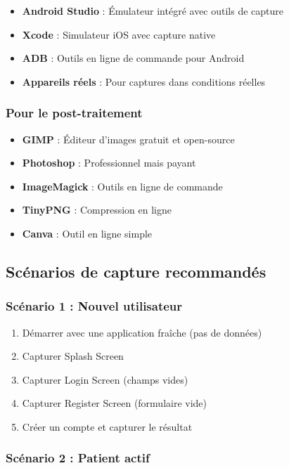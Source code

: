 \documentclass[a4paper,11pt]{report}
\begin{document}
\begin{itemize}
    \item \textbf{Android Studio} : Émulateur intégré avec outils de capture
    \item \textbf{Xcode} : Simulateur iOS avec capture native
    \item \textbf{ADB} : Outils en ligne de commande pour Android
    \item \textbf{Appareils réels} : Pour captures dans conditions réelles
\end{itemize}

\subsubsection{Pour le post-traitement}

\begin{itemize}
    \item \textbf{GIMP} : Éditeur d'images gratuit et open-source
    \item \textbf{Photoshop} : Professionnel mais payant
    \item \textbf{ImageMagick} : Outils en ligne de commande
    \item \textbf{TinyPNG} : Compression en ligne
    \item \textbf{Canva} : Outil en ligne simple
\end{itemize}

\subsection{Scénarios de capture recommandés}

\subsubsection{Scénario 1 : Nouvel utilisateur}

\begin{enumerate}
    \item Démarrer avec une application fraîche (pas de données)
    \item Capturer Splash Screen
    \item Capturer Login Screen (champs vides)
    \item Capturer Register Screen (formulaire vide)
    \item Créer un compte et capturer le résultat
\end{enumerate}

\subsubsection{Scénario 2 : Patient actif}
\end{document}
